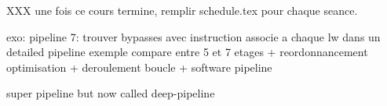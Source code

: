 XXX une fois ce cours termine, remplir schedule.tex pour chaque seance.

exo: pipeline 7: trouver bypasses avec instruction associe a chaque
     lw dans un detailed pipeline
exemple compare entre 5 et 7 etages + reordonnancement optimisation
+ deroulement boucle + software pipeline

super pipeline but now called deep-pipeline

